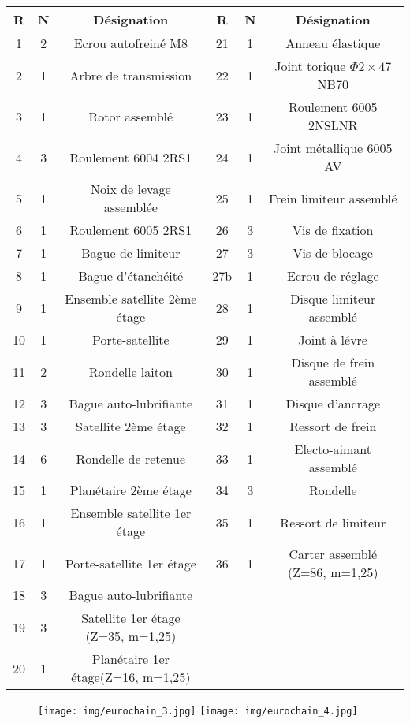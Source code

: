  \begin{tabular}{|c|c|c|c|c|c|}
 \hline
 R & N & Désignation & R & N & Désignation \\
 \hline
 1 & 2 & Ecrou autofreiné M8 & 21 & 1 & Anneau élastique \\
 \hline
 2 & 1 & Arbre de transmission & 22 & 1 & Joint torique $\Phi2\times47$ NB70 \\
 \hline
 3 & 1 & Rotor assemblé & 23 & 1 & Roulement 6005 2NSLNR \\
 \hline
 4 & 3 & Roulement 6004 2RS1 & 24 & 1 & Joint métallique 6005 AV \\
 \hline
 5 & 1 & Noix de levage assemblée & 25 & 1 & Frein limiteur assemblé \\
 \hline
 6 & 1 & Roulement 6005 2RS1 & 26 & 3 & Vis de fixation \\
 \hline
 7 & 1 & Bague de limiteur & 27 & 3 & Vis de blocage \\
 \hline
 8 & 1 & Bague d'étanchéité & 27b & 1 & Ecrou de réglage \\
 \hline
 9 & 1 & Ensemble satellite 2ème étage & 28 & 1 & Disque limiteur assemblé \\
 \hline
 10 & 1 & Porte-satellite & 29 & 1 & Joint à lévre \\
 \hline
 11 & 2 & Rondelle laiton & 30 & 1 & Disque de frein assemblé \\
 \hline
 12 & 3 & Bague auto-lubrifiante & 31 & 1 & Disque d'ancrage \\
 \hline
 13 & 3 & Satellite 2ème étage & 32 & 1 & Ressort de frein \\
 \hline
 14 & 6 & Rondelle de retenue & 33 & 1 & Electo-aimant assemblé \\
 \hline
 15 & 1 & Planétaire 2ème étage & 34 & 3 & Rondelle \\
 \hline
 16 & 1 & Ensemble satellite 1er étage & 35 & 1 & Ressort de limiteur \\
 \hline
 17 & 1 & Porte-satellite 1er étage & 36 & 1 & Carter assemblé (Z=86, m=1,25) \\
 \hline
 18 & 3 & Bague auto-lubrifiante &  &  &  \\
 \hline
 19 & 3 & Satellite 1er étage (Z=35, m=1,25) &  &  &  \\
 \hline
 20 & 1 & Planétaire 1er  étage(Z=16, m=1,25) &  &  &  \\
 \hline
\end{tabular}

\newpage

\begin{figure}[!h]
 \centering\texttt{[image: img/eurochain\_3.jpg]}
 \centering\texttt{[image: img/eurochain\_4.jpg]}
\end{figure}

